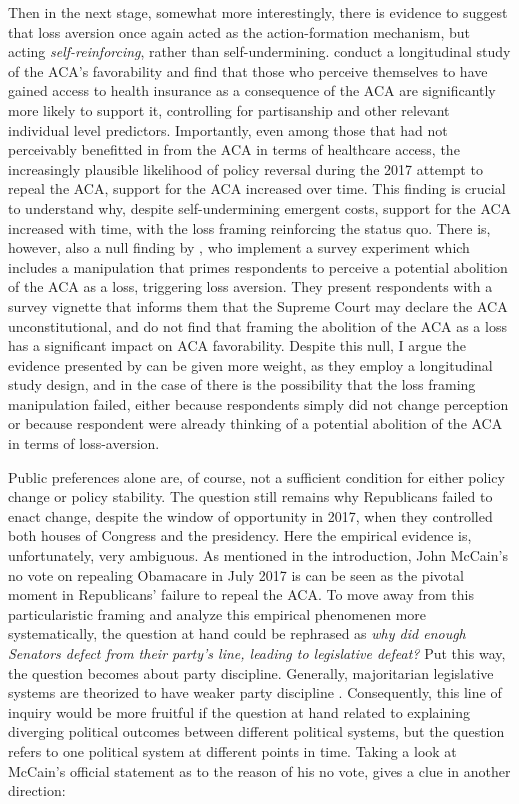 \documentclass[11pt]{article}
\begin{document}
Then in the next stage, somewhat more interestingly, there is evidence to suggest that loss aversion once again acted as the action-formation mechanism, but acting \textit{self-reinforcing}, rather than self-undermining. \textcite[][]{Mettler2022} conduct a longitudinal study of the ACA's favorability and find that those who perceive themselves to have gained access to health insurance as a consequence of the ACA are significantly more likely to support it, controlling for partisanship and other relevant individual level predictors. Importantly, even among those that had not perceivably benefitted in from the ACA in terms of healthcare access, the increasingly plausible likelihood of policy reversal during the 2017 attempt to repeal the ACA, support for the ACA increased over time. This finding is crucial to understand why, despite self-undermining emergent costs, support for the ACA increased with time, with the loss framing reinforcing the status quo. There is, however, also a null finding by \textcite[][]{Haeder2024}, who implement a survey experiment which includes a manipulation that primes respondents to perceive a potential abolition of the ACA as a loss, triggering loss aversion. They present respondents with a survey vignette that informs them that the Supreme Court may declare the ACA unconstitutional, and do not find that framing the abolition of the ACA as a loss has a significant impact on ACA favorability. Despite this null, I argue the evidence presented by \textcite[][]{Mettler2022} can be given more weight, as they employ a longitudinal study design, and in the case of \textcite[][]{Haeder2024} there is the possibility that the loss framing manipulation failed, either because respondents simply did not change perception or because respondent were already thinking of a potential abolition of the ACA in terms of loss-aversion.

Public preferences alone are, of course, not a sufficient condition for either policy change or policy stability. The question still remains why Republicans failed to enact change, despite the window of opportunity in 2017, when they controlled both houses of Congress and the presidency. Here the empirical evidence is, unfortunately, very ambiguous. As mentioned in the introduction, John McCain's no vote on repealing Obamacare in July 2017 is can be seen as the pivotal moment in Republicans' failure to repeal the ACA. To move away from this particularistic framing and analyze this empirical phenomenen more systematically, the question at hand could be rephrased as \textit{why did enough Senators defect from their party's line, leading to legislative defeat?} Put this way, the question becomes about party discipline. Generally, majoritarian legislative systems are theorized to have weaker party discipline \parencite[see e.g.][]{Kem2014}. Consequently, this line of inquiry would be more fruitful if the question at hand related to explaining diverging political outcomes between different political systems, but the question refers to one political system at different points in time. Taking a look at McCain's official statement as to the reason of his no vote, gives a clue in another direction:
\end{document}
